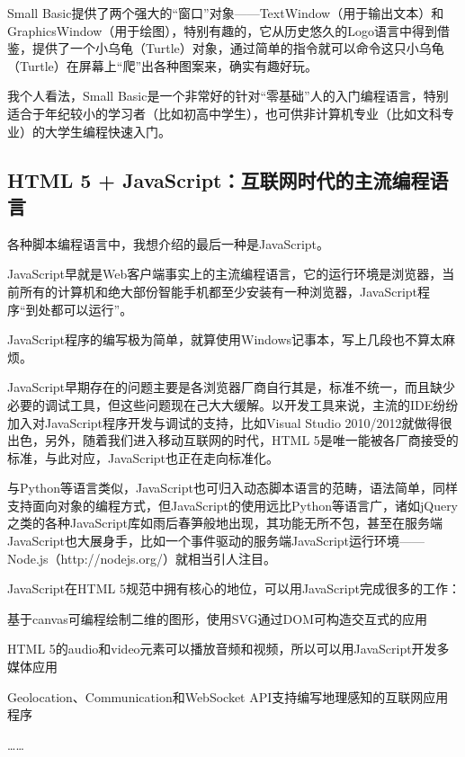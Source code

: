 Small Basic提供了两个强大的“窗口”对象——TextWindow（用于输出文本）和GraphicsWindow（用于绘图），特别有趣的，它从历史悠久的Logo语言中得到借鉴，提供了一个小乌龟（Turtle）对象，通过简单的指令就可以命令这只小乌龟（Turtle）在屏幕上“爬”出各种图案来，确实有趣好玩。

我个人看法，Small Basic是一个非常好的针对“零基础”人的入门编程语言，特别适合于年纪较小的学习者（比如初高中学生），也可供非计算机专业（比如文科专业）的大学生编程快速入门。


\subsection{HTML 5 + JavaScript：互联网时代的主流编程语言}

各种脚本编程语言中，我想介绍的最后一种是JavaScript。

JavaScript早就是Web客户端事实上的主流编程语言，它的运行环境是浏览器，当前所有的计算机和绝大部份智能手机都至少安装有一种浏览器，JavaScript程序“到处都可以运行”。

JavaScript程序的编写极为简单，就算使用Windows记事本，写上几段也不算太麻烦。

JavaScript早期存在的问题主要是各浏览器厂商自行其是，标准不统一，而且缺少必要的调试工具，但这些问题现在己大大缓解。以开发工具来说，主流的IDE纷纷加入对JavaScript程序开发与调试的支持，比如Visual Studio 2010/2012就做得很出色，另外，随着我们进入移动互联网的时代，HTML 5是唯一能被各厂商接受的标准，与此对应，JavaScript也正在走向标准化。

与Python等语言类似，JavaScript也可归入动态脚本语言的范畴，语法简单，同样支持面向对象的编程方式，但JavaScript的使用远比Python等语言广，诸如jQuery之类的各种JavaScript库如雨后春笋般地出现，其功能无所不包，甚至在服务端JavaScript也大展身手，比如一个事件驱动的服务端JavaScript运行环境——Node.js（http://nodejs.org/）就相当引人注目。

JavaScript在HTML 5规范中拥有核心的地位，可以用JavaScript完成很多的工作：

\begin{compactitem}
\item 基于canvas可编程绘制二维的图形，使用SVG通过DOM可构造交互式的应用
\item  HTML 5的audio和video元素可以播放音频和视频，所以可以用JavaScript开发多媒体应用
\item  Geolocation、Communication和WebSocket  API支持编写地理感知的互联网应用程序
\item  ……
\end{compactitem}

